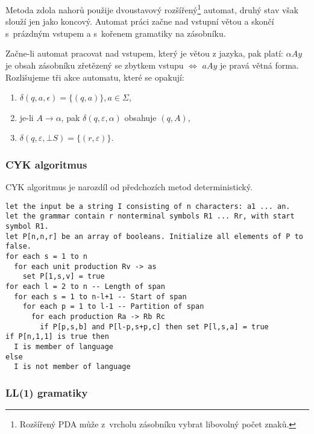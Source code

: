 \begin{example}

\end{example}

Metoda zdola nahorů použije dvoustavový rozšířený\footnote{Rozšířený
PDA může z~vrcholu zásobníku vybrat libovolný počet znaků.} automat, druhý
stav však slouží jen jako koncový. Automat práci začne
nad vstupní větou a skončí s~prázdným vstupem a s~kořenem gramatiky na
zásobníku.

Začne-li automat pracovat nad vstupem, který je větou z jazyka, pak
platí: $\alpha A y$ je obsah zásobníku zřetězený se zbytkem vstupu
$\iff$ $a A y$ je pravá větná forma. Rozlišujeme tři akce automatu,
které se opakují:
\begin{enumerate}
    \item $\delta(q, a, \epsilon) = \{ (q, a) \}, a \in \Sigma$,
    \item je-li $A \to \alpha$, pak $\delta(q, \varepsilon, \alpha)$
        obsahuje $(q, A)$,
    \item $\delta(q, \varepsilon, \bot S) = \{ (r, \varepsilon) \}$.
\end{enumerate}

\begin{example}
\end{example}


\subsubsection{CYK algoritmus}

CYK algoritmus je narozdíl od předchozích metod deterministický.

\begin{Verbatim}[fontsize=\small]
let the input be a string I consisting of n characters: a1 ... an.
let the grammar contain r nonterminal symbols R1 ... Rr, with start symbol R1.
let P[n,n,r] be an array of booleans. Initialize all elements of P to false.
for each s = 1 to n
  for each unit production Rv -> as
    set P[1,s,v] = true
for each l = 2 to n -- Length of span
  for each s = 1 to n-l+1 -- Start of span
    for each p = 1 to l-1 -- Partition of span
      for each production Ra -> Rb Rc
        if P[p,s,b] and P[l-p,s+p,c] then set P[l,s,a] = true
if P[n,1,1] is true then
  I is member of language
else
  I is not member of language
\end{Verbatim}

\subsubsection{LL(1) gramatiky}

